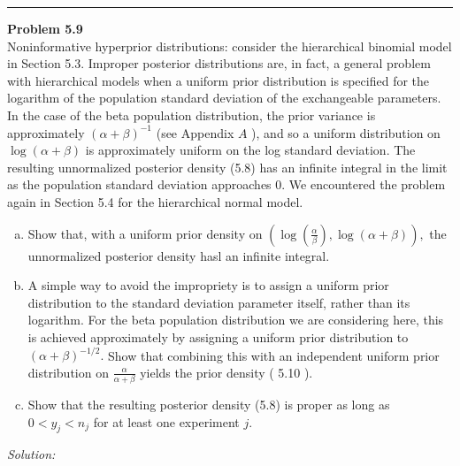 \documentclass[a4paper, 11pt]{article}
\newenvironment{problem}[2][Problem]
    { \begin{mdframed}[backgroundcolor=gray!20] \textbf{#1 #2} \\}
    {  \end{mdframed}}
\newenvironment{solution}
    {\textit{Solution:}}
    {}
\begin{document}
\noindent\rule{7in}{2.8pt}
\begin{problem}{5.9}
Noninformative hyperprior distributions: consider the hierarchical binomial model in Section 5.3. Improper posterior distributions are, in fact, a general problem with hierarchical models when a uniform prior distribution is specified for the logarithm of the population standard deviation of the exchangeable parameters. In the case of the beta population distribution, the prior variance is approximately $(\alpha+\beta)^{-1}$ (see Appendix $A$ ), and so a uniform distribution on $\log (\alpha+\beta)$ is approximately uniform on the log standard deviation. The resulting unnormalized posterior density (5.8) has an infinite integral in the limit as the population standard deviation approaches 0. We encountered the problem again in Section 5.4 for the hierarchical normal model.
\begin{enumerate}[(a)]
  \item Show that, with a uniform prior density on $\left(\log \left(\frac{\alpha}{\beta}\right), \log (\alpha+\beta)\right),$ the unnormalized posterior density hasl an infinite integral.
  \item A simple way to avoid the impropriety is to assign a uniform prior distribution to the standard deviation parameter itself, rather than its logarithm. For the beta population distribution we are considering here, this is achieved approximately by assigning a uniform prior distribution to $(\alpha+\beta)^{-1 / 2} .$ Show that combining this with an independent uniform prior distribution on $\frac{\alpha}{\alpha+\beta}$ yields the prior density ( 5.10 ).
  \item Show that the resulting posterior density (5.8) is proper as long as $0<y_{j}<n_{j}$ for at least one experiment $j$.
\end{enumerate}

\end{problem}
\begin{solution}

\end{solution}
\end{document}
